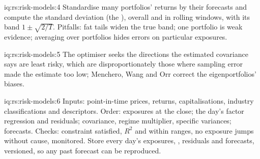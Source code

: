 \begin{solution}{iq:rs:risk-models:4}
Standardise many portfolios' returns by their forecasts and compute the standard deviation (the ), overall and in rolling windows, with its band
$1 \pm \sqrt{2/T}$. Pitfalls: fat tails widen the true band; one portfolio is weak evidence; averaging over portfolios hides errors on particular exposures.
\end{solution}

\begin{solution}{iq:rs:risk-models:5}
The optimiser seeks the directions the estimated covariance says are least risky, which are disproportionately those where sampling error made the estimate too
low; Menchero, Wang and Orr correct the eigenportfolios' biases.
\end{solution}

\begin{solution}{iq:rs:risk-models:6}
Inputs: point-in-time prices, returns, capitalisations, industry classifications and descriptors. Order: exposures at the close; the day's factor regression and
residuals; covariance, regime multiplier, specific variances; forecasts. Checks: constraint satisfied, $R^2$ and  within ranges, no exposure jumps
without cause,  monitored. Store every day's exposures, , residuals and forecasts, versioned, so any past forecast can be reproduced.
\end{solution}
